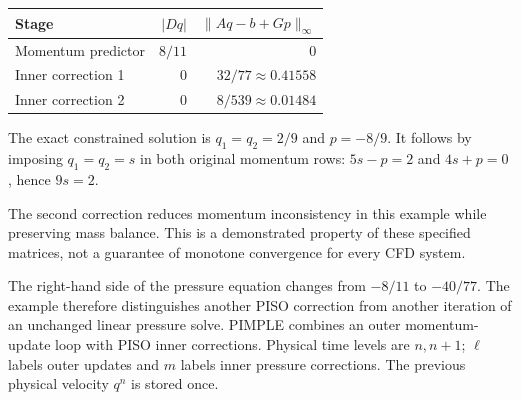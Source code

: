 \begin{center}\begin{tabular}{lrr}\toprule
Stage & $|Dq|$ & $\|Aq-b+Gp\|_\infty$\\\midrule
Momentum predictor & $8/11$ & $0$\\
Inner correction 1 & $0$ & $32/77\approx0.41558$\\
Inner correction 2 & $0$ & $8/539\approx0.01484$\\\bottomrule
\end{tabular}\end{center}
The exact constrained solution is $q_1=q_2=2/9$ and $p=-8/9$. It follows by imposing $q_1=q_2=s$ in both original momentum rows: $5s-p=2$ and $4s+p=0$, hence $9s=2$.

The second correction reduces momentum inconsistency in this example while preserving mass balance. This is a demonstrated property of these specified matrices, not a guarantee of monotone convergence for every CFD system.

The right-hand side of the pressure equation changes from $-8/11$ to $-40/77$. The example therefore distinguishes another PISO correction from another iteration of an unchanged linear pressure solve.
\newpage
{}
PIMPLE combines an outer momentum-update loop with PISO inner corrections. Physical time levels are $n,n+1$; $\ell$ labels outer updates and $m$ labels inner pressure corrections. The previous physical velocity $q^n$ is stored once.

